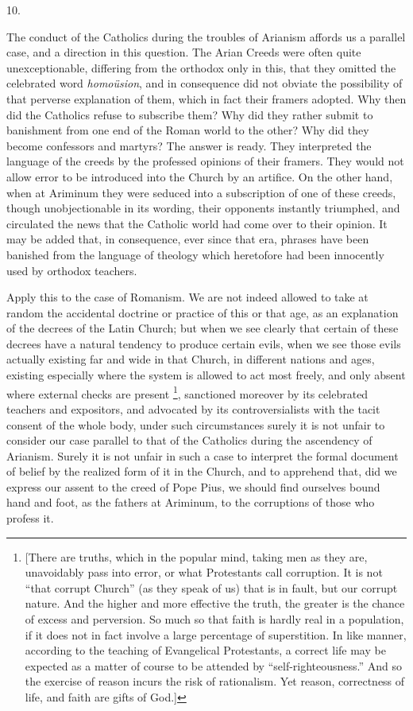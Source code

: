 10.

The conduct of the Catholics during the troubles
of Arianism affords us a parallel case, and a direction in this
question. The Arian Creeds were often quite unexceptionable, differing
from the orthodox only in this, that they omitted the celebrated word \emph{homoüsion},
and in consequence did not obviate the possibility of that perverse
explanation of them, which in fact their framers adopted. Why then did
the Catholics refuse to subscribe them? Why did they rather submit to
banishment from one end of the Roman world to the other? Why did they
become confessors and martyrs? The answer is ready. They
interpreted the language of the creeds by the professed opinions of
their framers. They would not allow error to be introduced into the
Church by an artifice. On the other hand, when at Ariminum they were
seduced into a subscription of one of these creeds, though
unobjectionable in its wording, their opponents instantly triumphed,
and circulated the news that the Catholic world had come over to their
opinion. It may be added that, in consequence, ever since that era,
phrases have been banished from the language of theology which
heretofore had been innocently used by orthodox teachers.

Apply this to the case of Romanism. We are not
indeed allowed to take at random the accidental doctrine or practice
of this or that age, as an explanation of the decrees of the Latin
Church; but when we see clearly that certain of these decrees have a
natural tendency to produce certain evils, when we see those evils
actually existing far and wide in that Church, in different nations
and ages, existing especially where the system is allowed to act most
freely, and only absent where external checks are present \footnote{[There are truths, which in the popular mind, taking men as they are,
unavoidably pass into error, or what Protestants call corruption. It
is not ``that corrupt Church'' (as they speak of us) that is in fault,
but our corrupt nature. And the higher and more effective the truth,
the greater is the chance of excess and perversion. So much so that
faith is hardly real in a population, if it does not in fact involve a
large percentage of superstition. In like manner, according to the
teaching of Evangelical Protestants, a correct life may be expected as
a matter of course to be attended by ``self-righteousness.'' And so the
exercise of reason incurs the risk of rationalism. Yet reason,
correctness of life, and faith are gifts of God.]}, sanctioned moreover by its celebrated teachers and
expositors, and advocated by its controversialists with the tacit
consent of the whole body, under such circumstances surely it is not
unfair to consider our case parallel to that of the Catholics during
the ascendency of Arianism. Surely it is not unfair in such a
case to interpret the formal document of belief by the realized form
of it in the Church, and to apprehend that, did we express our assent
to the creed of Pope Pius, we should find ourselves bound hand and
foot, as the fathers at Ariminum, to the corruptions of those who
profess it.


